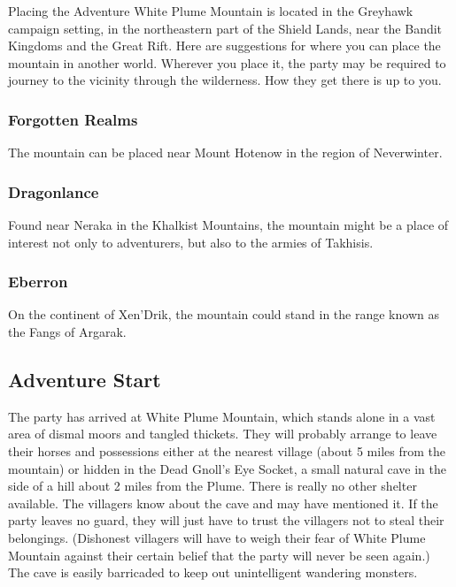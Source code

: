 \documentclass[10pt,a4paper,twoside,bg=print,twocolumn,openany,nodeprecatedcode]{dndbook}
\begin{document}
\begin{DndSidebar}[float=!b]{Placing the Adventure}
White Plume Mountain is located in the Greyhawk campaign setting, in the northeastern part of the Shield Lands, near the Bandit Kingdoms and the Great Rift. Here are suggestions for where you can place the mountain in another world. Wherever you place it, the party may be required to journey to the vicinity through the wilderness. How they get there is up to you.



\subsubsection{Forgotten Realms}
The mountain can be placed near Mount Hotenow in the region of Neverwinter.



\subsubsection{Dragonlance}
Found near Neraka in the Khalkist Mountains, the mountain might be a place of interest not only to adventurers, but also to the armies of Takhisis.



\subsubsection{Eberron}
On the continent of Xen'Drik, the mountain could stand in the range known as the Fangs of Argarak.



\end{DndSidebar}

\subsection{Adventure Start}
The party has arrived at White Plume Mountain, which stands alone in a vast area of dismal moors and tangled thickets. They will probably arrange to leave their horses and possessions either at the nearest village (about 5 miles from the mountain) or hidden in the Dead Gnoll's Eye Socket, a small natural cave in the side of a hill about 2 miles from the Plume. There is really no other shelter available. The villagers know about the cave and may have mentioned it. If the party leaves no guard, they will just have to trust the villagers not to steal their belongings. (Dishonest villagers will have to weigh their fear of White Plume Mountain against their certain belief that the party will never be seen again.) The cave is easily barricaded to keep out unintelligent wandering monsters.
\end{document}
